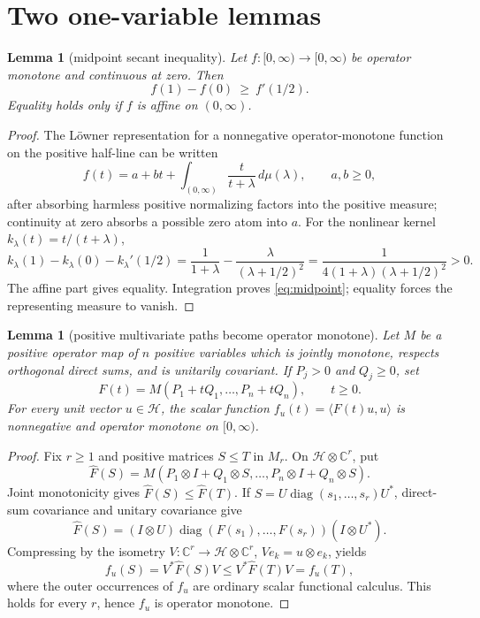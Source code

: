 \documentclass[11pt]{article}
\newtheorem{lemma}[theorem]{Lemma}
\begin{document}
\section{Two one-variable lemmas}

\begin{lemma}[midpoint secant inequality]\label{lem:scalar}
Let $f:[0,\infty)\to[0,\infty)$ be operator monotone and continuous at
zero.  Then
\begin{equation}\label{eq:midpoint}
   f(1)-f(0)\ \geq\ f'(1/2).
\end{equation}
Equality holds only if $f$ is affine on $(0,\infty)$.
\end{lemma}

\begin{proof}
The L\"owner representation for a nonnegative operator-monotone function on
the positive half-line can be written
\[
 f(t)=a+bt+\int_{(0,\infty)}\frac{t}{t+\lambda}\,d\mu(\lambda),
 \qquad a,b\geq0,
\]
after absorbing harmless positive normalizing factors into the positive
measure; continuity at zero absorbs a possible zero atom into $a$.
For the nonlinear kernel $k_\lambda(t)=t/(t+\lambda)$,
\[
 k_\lambda(1)-k_\lambda(0)-k_\lambda'(1/2)
 =\frac{1}{1+\lambda}-\frac{\lambda}{(\lambda+1/2)^2}
 =\frac{1}{4(1+\lambda)(\lambda+1/2)^2}>0.
\]
The affine part gives equality.  Integration proves \eqref{eq:midpoint};
equality forces the representing measure to vanish.
\end{proof}

\begin{lemma}[positive multivariate paths become operator monotone]
\label{lem:path}
Let $M$ be a positive operator map of $n$ positive variables which is
jointly monotone, respects orthogonal direct sums, and is unitarily
covariant.  If $P_j>0$ and $Q_j\geq0$, set
\[
   F(t)=M(P_1+tQ_1,\ldots,P_n+tQ_n),\qquad t\geq0.
\]
For every unit vector $u\in\mathcal H$, the scalar function
$f_u(t)=\langle F(t)u,u\rangle$ is nonnegative and operator monotone on
$[0,\infty)$.
\end{lemma}

\begin{proof}
Fix $r\geq1$ and positive matrices $S\leq T$ in $M_r$.  On
$\mathcal H\otimes\mathbb C^r$, put
\[
 \widehat F(S)=M(P_1\otimes I+Q_1\otimes S,\ldots,
                    P_n\otimes I+Q_n\otimes S).
\]
Joint monotonicity gives $\widehat F(S)\leq\widehat F(T)$.  If
$S=U\operatorname{diag}(s_1,\ldots,s_r)U^*$, direct-sum covariance and
unitary covariance give
\[
 \widehat F(S)=(I\otimes U)\operatorname{diag}
    (F(s_1),\ldots,F(s_r))(I\otimes U^*).
\]
Compressing by the isometry $V:\mathbb C^r\to\mathcal H\otimes\mathbb C^r$,
$Ve_k=u\otimes e_k$, yields
\[
   f_u(S)=V^*\widehat F(S)V\leq V^*\widehat F(T)V=f_u(T),
\]
where the outer occurrences of $f_u$ are ordinary scalar functional
calculus.  This holds for every $r$, hence $f_u$ is operator monotone.
\end{proof}
\end{document}
